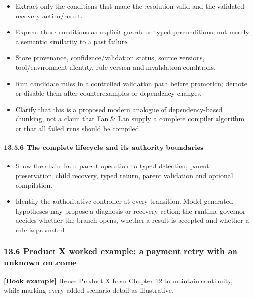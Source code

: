 \begin{itemize}
\tightlist
\item
  Extract only the conditions that made the resolution valid and the validated recovery action/result.
\item
  Express those conditions as explicit guards or typed preconditions, not merely a semantic similarity to a past failure.
\item
  Store provenance, confidence/validation status, source versions, tool/environment identity, rule version and invalidation conditions.
\item
  Run candidate rules in a controlled validation path before promotion; demote or disable them after counterexamples or dependency changes.
\item
  Clarify that this is a proposed modern analogue of dependency-based chunking, not a claim that Fan \& Lan supply a complete compiler algorithm or that all failed runs should be compiled.
\end{itemize}

\paragraph{13.5.6 The complete lifecycle and its authority boundaries}\label{the-complete-lifecycle-and-its-authority-boundaries}

\begin{itemize}
\tightlist
\item
  Show the chain from parent operation to typed detection, parent preservation, child recovery, typed return, parent validation and optional compilation.
\item
  Identify the authoritative controller at every transition. Model-generated hypotheses may propose a diagnosis or recovery action; the runtime governor decides whether the branch opens, whether a result is accepted and whether a rule is promoted.
\end{itemize}

\subsubsection{13.6 Product X worked example: a payment retry with an unknown outcome}\label{product-x-worked-example-a-payment-retry-with-an-unknown-outcome}

\textbf{{[}Book example{]}} Reuse Product X from Chapter 12 to maintain continuity, while marking every added scenario detail as illustrative.

